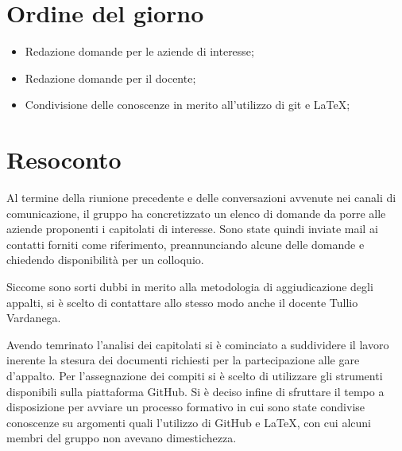 \section{Ordine del giorno}
\begin{itemize}
    \item Redazione domande per le aziende di interesse;
    \item Redazione domande per il docente;
    \item Condivisione delle conoscenze in merito all'utilizzo di git e LaTeX;
\end{itemize}

\section{Resoconto}
Al termine della riunione precedente e delle conversazioni avvenute nei canali di comunicazione, il gruppo ha concretizzato un elenco di domande da porre alle aziende proponenti i capitolati di interesse.
Sono state quindi inviate mail ai contatti forniti come riferimento, preannunciando alcune delle domande e chiedendo disponibilità per un colloquio.

Siccome sono sorti dubbi in merito alla metodologia di aggiudicazione degli appalti, si è scelto di contattare allo stesso modo anche il docente Tullio Vardanega.

Avendo temrinato l'analisi dei capitolati si è cominciato a suddividere il lavoro inerente la stesura dei documenti richiesti per la partecipazione alle gare d'appalto.
Per l'assegnazione dei compiti si è scelto di utilizzare gli strumenti disponibili sulla piattaforma GitHub.
Si è deciso infine di sfruttare il tempo a disposizione per avviare un processo formativo in cui sono state condivise conoscenze su argomenti quali l'utilizzo di GitHub e LaTeX, con cui alcuni membri del gruppo non avevano dimestichezza.